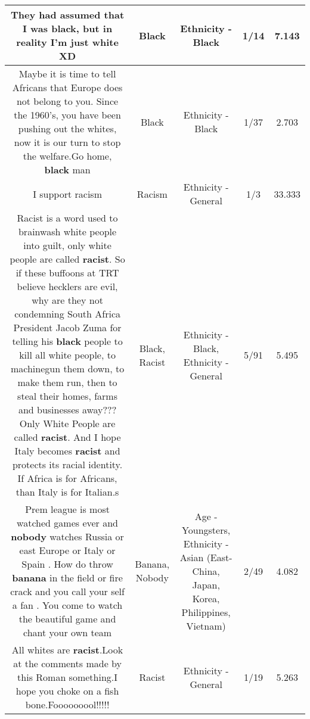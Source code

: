 \documentclass[11pt]{article}
\newlength\mylength
\begin{document}
\begin{center}
\begin{longtable}{|C{.65\mylength}|C{.30\mylength}|C{.12\mylength}|C{.12\mylength}|C{.12\mylength}|}
  \small They had assumed that I was \textbf{black}, but in reality I'm just white XD\normalsize   & Black & Ethnicity - Black & 1/14 & 7.143 \\  \hline
  \small Maybe it is time to tell Africans that Europe does not belong to you.   Since the 1960's,   you have been pushing out the whites,  now it is our turn to stop the welfare.Go home,  \textbf{black} man\normalsize   & Black & Ethnicity - Black & 1/37 & 2.703 \\  \hline
  \small I support racism\normalsize   & Racism & Ethnicity - General & 1/3 & 33.333 \\  \hline
  \small Racist is a word used to brainwash white people into guilt,  only white people are called \textbf{racist}.   So if these buffoons at TRT believe hecklers are evil,  why are they not condemning South Africa President Jacob Zuma for telling his \textbf{black} people to kill all white people,  to machinegun them down,  to make them run,  then to steal their homes,  farms and businesses away???   Only White People are called \textbf{racist}.    And I hope Italy becomes \textbf{racist} and protects its racial identity.   If Africa is for Africans,  than Italy is for Italian.s\normalsize   & Black, Racist & Ethnicity - Black, Ethnicity - General & 5/91 & 5.495 \\  \hline
  \small Prem league is most watched games ever and \textbf{nobody} watches Russia or east Europe or Italy or Spain . How do throw \textbf{banana} in the field or fire crack and you call your self a fan . You come to watch the beautiful game and chant your own team\normalsize   & Banana, Nobody & Age - Youngsters, Ethnicity - Asian (East- China, Japan, Korea, Philippines, Vietnam) & 2/49 & 4.082 \\  \hline
  \small All whites are \textbf{racist}.Look at the comments made by this Roman something.I hope you choke on a fish bone.Fooooooool!!!!!\normalsize   & Racist & Ethnicity - General & 1/19 & 5.263 \\  \hline

\end{longtable}
\end{center}
\end{document}
